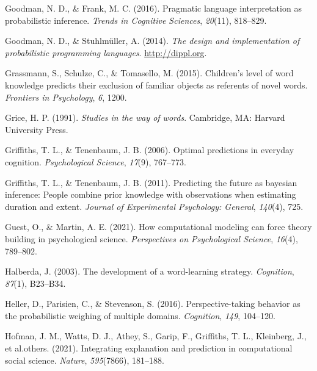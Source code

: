 \documentclass[
  man,floatsintext]{apa6}
\newlength{\cslhangindent}
\newlength{\cslentryspacingunit} %
\newenvironment{CSLReferences}[2] %
 {%
  \setlength{\parindent}{0pt}
  \ifodd #1
  \let\oldpar\par
  \def\par{\hangindent=\cslhangindent\oldpar}
  \fi
  \setlength{\parskip}{#2\cslentryspacingunit}
 }%
 {}
\begin{document}
\begin{CSLReferences}{1}{0}
\leavevmode{}%
Goodman, N. D., \& Frank, M. C. (2016). Pragmatic language interpretation as probabilistic inference. \emph{Trends in Cognitive Sciences}, \emph{20}(11), 818--829.

\leavevmode{}%
Goodman, N. D., \& Stuhlmüller, A. (2014). \emph{{The design and implementation of probabilistic programming languages}}. \url{http://dippl.org}.

\leavevmode{}%
Grassmann, S., Schulze, C., \& Tomasello, M. (2015). Children's level of word knowledge predicts their exclusion of familiar objects as referents of novel words. \emph{Frontiers in Psychology}, \emph{6}, 1200.

\leavevmode{}%
Grice, H. P. (1991). \emph{Studies in the way of words}. Cambridge, MA: Harvard University Press.

\leavevmode{}%
Griffiths, T. L., \& Tenenbaum, J. B. (2006). Optimal predictions in everyday cognition. \emph{Psychological Science}, \emph{17}(9), 767--773.

\leavevmode{}%
Griffiths, T. L., \& Tenenbaum, J. B. (2011). Predicting the future as bayesian inference: People combine prior knowledge with observations when estimating duration and extent. \emph{Journal of Experimental Psychology: General}, \emph{140}(4), 725.

\leavevmode{}%
Guest, O., \& Martin, A. E. (2021). How computational modeling can force theory building in psychological science. \emph{Perspectives on Psychological Science}, \emph{16}(4), 789--802.

\leavevmode{}%
Halberda, J. (2003). The development of a word-learning strategy. \emph{Cognition}, \emph{87}(1), B23--B34.

\leavevmode{}%
Heller, D., Parisien, C., \& Stevenson, S. (2016). Perspective-taking behavior as the probabilistic weighing of multiple domains. \emph{Cognition}, \emph{149}, 104--120.

\leavevmode{}%
Hofman, J. M., Watts, D. J., Athey, S., Garip, F., Griffiths, T. L., Kleinberg, J., et al.others. (2021). Integrating explanation and prediction in computational social science. \emph{Nature}, \emph{595}(7866), 181--188.


\end{CSLReferences}
\end{document}
